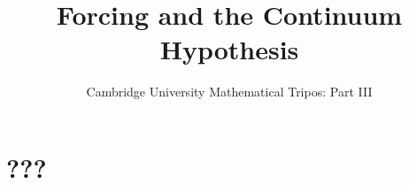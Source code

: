 \documentclass{article}
\title{Forcing and the Continuum Hypothesis}
\author{Cambridge University Mathematical Tripos: Part III}
\begin{document}
\maketitle

\tableofcontentsnewpage{}

\section{???}

\end{document}
